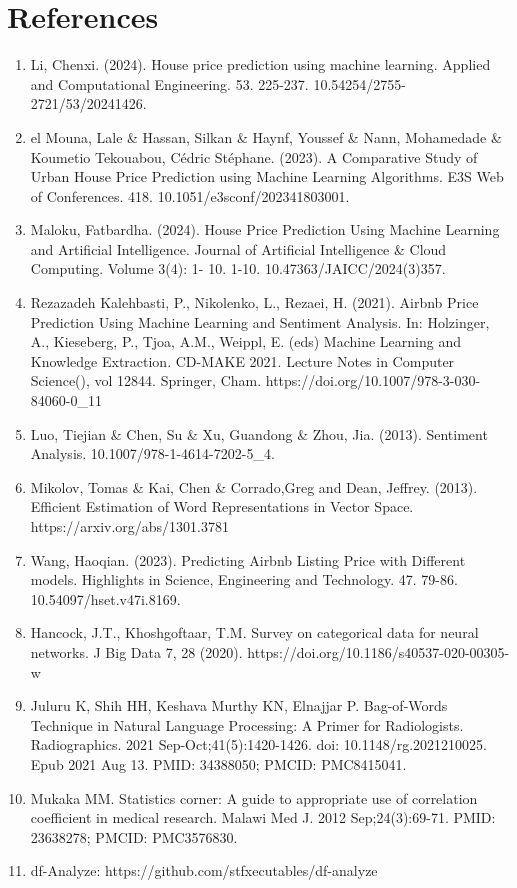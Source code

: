 \documentclass[a4paper,12pt]{article}
\begin{document}
\newpage
\sloppy
\section*{References}
\begin{enumerate}
  \item Li, Chenxi. (2024). House price prediction using machine learning. Applied and Computational Engineering. 53. 225-237. 10.54254/2755-2721/53/20241426.
  \item el Mouna, Lale \& Hassan, Silkan \& Haynf, Youssef \& Nann, Mohamedade \& Koumetio Tekouabou, Cédric Stéphane. (2023). A Comparative Study of Urban House Price Prediction using Machine Learning Algorithms. E3S Web of Conferences. 418. 10.1051/e3sconf/202341803001. 
  \item Maloku, Fatbardha. (2024). House Price Prediction Using Machine Learning and Artificial Intelligence. Journal of Artificial Intelligence \& Cloud Computing. Volume 3(4): 1- 10. 1-10. 10.47363/JAICC/2024(3)357. 
  \item Rezazadeh Kalehbasti, P., Nikolenko, L., Rezaei, H. (2021). Airbnb Price Prediction Using Machine Learning and Sentiment Analysis. In: Holzinger, A., Kieseberg, P., Tjoa, A.M., Weippl, E. (eds) Machine Learning and Knowledge Extraction. CD-MAKE 2021. Lecture Notes in Computer Science(), vol 12844. Springer, Cham. https://doi.org/10.1007/978-3-030-84060-0\_11
  \item Luo, Tiejian \& Chen, Su \& Xu, Guandong \& Zhou, Jia. (2013). Sentiment Analysis. 10.1007/978-1-4614-7202-5\_4. 
  \item Mikolov, Tomas \& Kai, Chen \& Corrado,Greg and Dean, Jeffrey. (2013). Efficient Estimation of Word Representations in Vector Space. https://arxiv.org/abs/1301.3781
  \item Wang, Haoqian. (2023). Predicting Airbnb Listing Price with Different models. Highlights in Science, Engineering and Technology. 47. 79-86. 10.54097/hset.v47i.8169.
  \item Hancock, J.T., Khoshgoftaar, T.M. Survey on categorical data for neural networks. J Big Data 7, 28 (2020). https://doi.org/10.1186/s40537-020-00305-w
  \item Juluru K, Shih HH, Keshava Murthy KN, Elnajjar P. Bag-of-Words Technique in Natural Language Processing: A Primer for Radiologists. Radiographics. 2021 Sep-Oct;41(5):1420-1426. doi: 10.1148/rg.2021210025. Epub 2021 Aug 13. PMID: 34388050; PMCID: PMC8415041.
  \item Mukaka MM. Statistics corner: A guide to appropriate use of correlation coefficient in medical research. Malawi Med J. 2012 Sep;24(3):69-71. PMID: 23638278; PMCID: PMC3576830.
  \item df-Analyze: https://github.com/stfxecutables/df-analyze
\end{enumerate}
\end{document}
